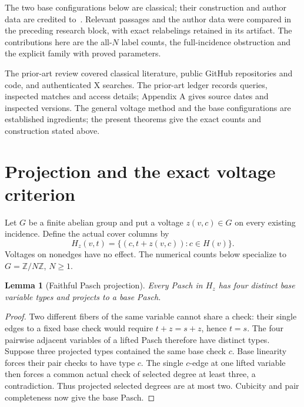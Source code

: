 \documentclass[11pt]{article}
\newtheorem{lemma}[theorem]{Lemma}
\newcommand{\Z}{\mathbb Z}
\begin{document}
The two base configurations below are classical; their construction and author
data are credited to~\cite{PP,AFKL}. Relevant passages and the author data were
compared in the preceding research block, with exact relabelings retained in
its artifact. The contributions here are the all-$N$ label counts, the
full-incidence obstruction and the explicit family with proved parameters.

The prior-art review covered classical literature, public GitHub repositories
and code, and authenticated X searches. The prior-art ledger records queries,
inspected matches and access details; Appendix A gives source dates and
inspected versions. The general voltage method and the base configurations
are established ingredients; the present theorems give the exact counts and
construction stated above.

\section{Projection and the exact voltage criterion}
Let $G$ be a finite abelian group and put a voltage $z(v,c)\in G$ on every
existing incidence. Define the actual cover columns by
\begin{equation}\label{eq:cover}
 H_z(v,t)=\{(c,t+z(v,c)):c\in H(v)\}.
\end{equation}
Voltages on nonedges have no effect. The numerical counts below specialize to
$G=\Z/N\Z$, $N\geq1$.

\begin{lemma}[Faithful Pasch projection]\label{lem:projection}
Every Pasch in $H_z$ has four distinct base variable types and projects to a
base Pasch.
\end{lemma}
\begin{proof}
Two different fibers of the same variable cannot share a check: their single
edges to a fixed base check would require $t+z=s+z$, hence $t=s$. The four
pairwise adjacent variables of a lifted Pasch therefore have distinct types.
Suppose three projected types contained the same base check $c$. Base linearity
forces their pair checks to have type $c$. The single $c$-edge at one lifted
variable then forces a common actual check of selected degree at least three,
a contradiction. Thus projected selected degrees are at most two. Cubicity and
pair completeness now give the base Pasch.
\end{proof}
\end{document}
